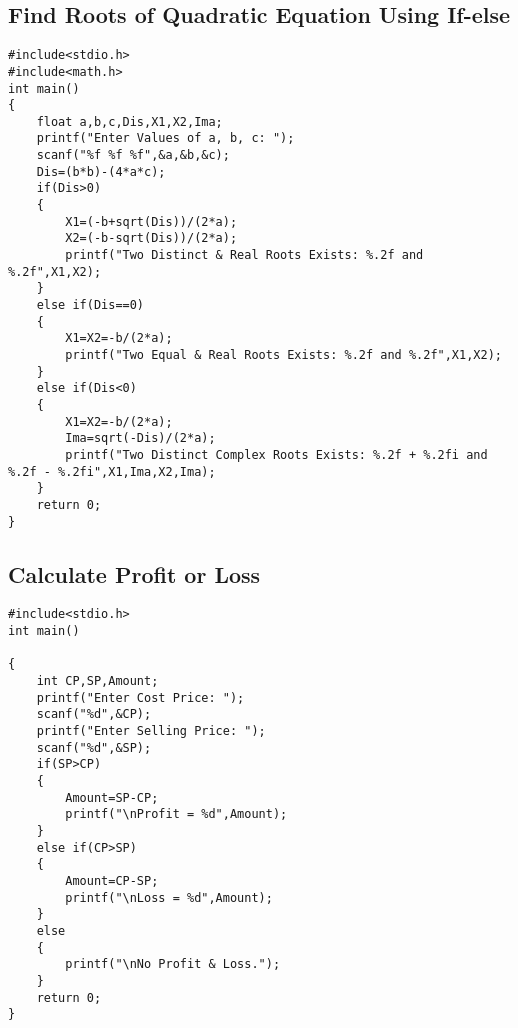 \documentclass[a4paper,14pt]{article}
\begin{document}
\subsection{Find Roots of Quadratic Equation Using If-else}
\vspace{0.5cm}
\begin{lstlisting}[caption={Find Roots of Quadratic Equation Using If-else}]
#include<stdio.h>
#include<math.h>
int main()
{
    float a,b,c,Dis,X1,X2,Ima;
    printf("Enter Values of a, b, c: ");
    scanf("%f %f %f",&a,&b,&c);
    Dis=(b*b)-(4*a*c);
    if(Dis>0)
    {
        X1=(-b+sqrt(Dis))/(2*a);
        X2=(-b-sqrt(Dis))/(2*a);
        printf("Two Distinct & Real Roots Exists: %.2f and %.2f",X1,X2);
    }
    else if(Dis==0)
    {
        X1=X2=-b/(2*a);
        printf("Two Equal & Real Roots Exists: %.2f and %.2f",X1,X2);
    }
    else if(Dis<0)
    {
        X1=X2=-b/(2*a);
        Ima=sqrt(-Dis)/(2*a);
        printf("Two Distinct Complex Roots Exists: %.2f + %.2fi and %.2f - %.2fi",X1,Ima,X2,Ima);
    }
    return 0;
}
\end{lstlisting}
\newpage

\subsection{Calculate Profit or Loss}
\vspace{0.5cm}
\begin{lstlisting}[caption={Calculate Profit or Loss}]
#include<stdio.h>
int main()
 
{
    int CP,SP,Amount;
    printf("Enter Cost Price: ");
    scanf("%d",&CP);
    printf("Enter Selling Price: ");
    scanf("%d",&SP);
    if(SP>CP)
    {
        Amount=SP-CP;
        printf("\nProfit = %d",Amount);
    }
    else if(CP>SP)
    {
        Amount=CP-SP;
        printf("\nLoss = %d",Amount);
    }
    else
    {
        printf("\nNo Profit & Loss.");
    }
    return 0;
}
\end{lstlisting}
\newpage
\end{document}
